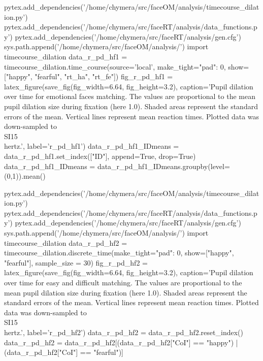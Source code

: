 \begin{pycode}[r_pd_hf1]
pytex.add_dependencies('/home/chymera/src/faceOM/analysis/timecourse_dilation.py')
pytex.add_dependencies('/home/chymera/src/faceRT/analysis/data_functions.py')
pytex.add_dependencies('/home/chymera/src/faceRT/analysis/gen.cfg')
sys.path.append('/home/chymera/src/faceOM/analysis/')
import timecourse_dilation
data_r_pd_hf1 = timecourse_dilation.time_course(source='local', make_tight={"pad": 0}, show=["happy", "fearful", "rt_ha", "rt_fe"])
fig_r_pd_hf1 = latex_figure(save_fig(fig_width=6.64, fig_height=3.2), caption='Pupil dilation over time for emotional faces matching. The values are proportional to the mean pupil dilation size during fixation (here 1.0). Shaded areas represent the standard errors of the mean. Vertical lines represent mean reaction times. Plotted data was down-sampled to \\SI{15}{\\hertz}.', label='r_pd_hf1')
data_r_pd_hf1_IDmeans = data_r_pd_hf1.set_index(["ID"], append=True, drop=True)
data_r_pd_hf1_IDmeans = data_r_pd_hf1_IDmeans.groupby(level=(0,1)).mean()
\end{pycode}
\begin{pycode}[r_pd_hf2]
pytex.add_dependencies('/home/chymera/src/faceOM/analysis/timecourse_dilation.py')
pytex.add_dependencies('/home/chymera/src/faceRT/analysis/data_functions.py')
pytex.add_dependencies('/home/chymera/src/faceRT/analysis/gen.cfg')
sys.path.append('/home/chymera/src/faceOM/analysis/')
import timecourse_dilation
data_r_pd_hf2 = timecourse_dilation.discrete_time(make_tight={"pad": 0}, show=["happy", "fearful"], sample_size = 30)
fig_r_pd_hf2 = latex_figure(save_fig(fig_width=6.64, fig_height=3.2), caption='Pupil dilation over time for easy and difficult matching. The values are proportional to the mean pupil dilation size during fixation (here 1.0). Shaded areas represent the standard errors of the mean. Vertical lines represent mean reaction times. Plotted data was down-sampled to \\SI{15}{\\hertz}.', label='r_pd_hf2')
data_r_pd_hf2 = data_r_pd_hf2.reset_index()
data_r_pd_hf2 = data_r_pd_hf2[(data_r_pd_hf2["CoI"] == "happy") | (data_r_pd_hf2["CoI"] == "fearful")]
\end{pycode}
